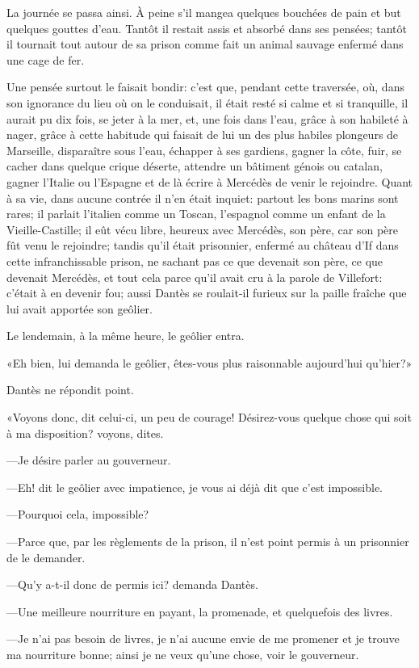 La journée se passa ainsi. À peine s'il mangea quelques bouchées de pain et but quelques gouttes d'eau. Tantôt il restait assis et absorbé dans ses pensées; tantôt il tournait tout autour de sa prison comme fait un animal sauvage enfermé dans une cage de fer.

Une pensée surtout le faisait bondir: c'est que, pendant cette traversée, où, dans son ignorance du lieu où on le conduisait, il était resté si calme et si tranquille, il aurait pu dix fois, se jeter à la mer, et, une fois dans l'eau, grâce à son habileté à nager, grâce à cette habitude qui faisait de lui un des plus habiles plongeurs de Marseille, disparaître sous l'eau, échapper à ses gardiens, gagner la côte, fuir, se cacher dans quelque crique déserte, attendre un bâtiment génois ou catalan, gagner l'Italie ou l'Espagne et de là écrire à Mercédès de venir le rejoindre. Quant à sa vie, dans aucune contrée il n'en était inquiet: partout les bons marins sont rares; il parlait l'italien comme un Toscan, l'espagnol comme un enfant de la Vieille-Castille; il eût vécu libre, heureux avec Mercédès, son père, car son père fût venu le rejoindre; tandis qu'il était prisonnier, enfermé au château d'If dans cette infranchissable prison, ne sachant pas ce que devenait son père, ce que devenait Mercédès, et tout cela parce qu'il avait cru à la parole de Villefort: c'était à en devenir fou; aussi Dantès se roulait-il furieux sur la paille fraîche que lui avait apportée son geôlier.

Le lendemain, à la même heure, le geôlier entra.

«Eh bien, lui demanda le geôlier, êtes-vous plus raisonnable aujourd'hui qu'hier?»

Dantès ne répondit point.

«Voyons donc, dit celui-ci, un peu de courage! Désirez-vous quelque chose qui soit à ma disposition? voyons, dites.

—Je désire parler au gouverneur.

—Eh! dit le geôlier avec impatience, je vous ai déjà dit que c'est impossible.

—Pourquoi cela, impossible?

—Parce que, par les règlements de la prison, il n'est point permis à un prisonnier de le demander.

—Qu'y a-t-il donc de permis ici? demanda Dantès.

—Une meilleure nourriture en payant, la promenade, et quelquefois des livres.

—Je n'ai pas besoin de livres, je n'ai aucune envie de me promener et je trouve ma nourriture bonne; ainsi je ne veux qu'une chose, voir le gouverneur.

